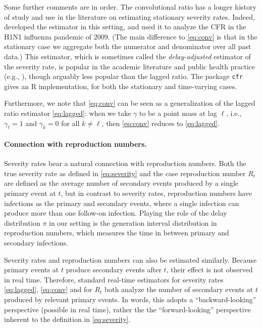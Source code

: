 \documentclass{article}
\begin{document}
Some further comments are in order. The convolutional ratio has a longer history
of study and use in the literature on estimating stationary severity
rates. Indeed, \citet{nishiura} developed the estimator in this setting,  
and used it to analyze the CFR in the H1N1 influenza pandemic of 2009. (The main 
difference to \eqref{eq:conv} is that in the stationary case we aggregate both
the numerator and denominator over all past data.) This estimator, which is
sometimes called the \emph{delay-adjusted} estimator of the severity rate, is
popular in the academic literature and public health practice (e.g., 
\citealp{nishiuraEx1, nishiuraEx2, Russell2020, Unnikrishnan2021}), though   
arguably less popular than the lagged ratio. The package \texttt{cfr}
\citep{cfr_package} gives an R implementation, for both the stationary and
time-varying cases.  

Furthermore, we note that \eqref{eq:conv} can be seen as a generalization of the  
lagged ratio estimator \eqref{eq:lagged}: when we take $\gamma$ to be a point
mass at lag $\ell$, i.e., $\gamma_\ell = 1$ and $\gamma_k = 0$ for all $k \not=
\ell$, then \eqref{eq:conv} reduces to \eqref{eq:lagged}.   

\paragraph{Connection with reproduction numbers.} 

Severity rates bear a natural connection with reproduction numbers. Both the
true severity rate as defined in \eqref{eq:severity} and the case reproduction
number $R_t$ are defined as the average number of secondary events produced by a
single primary event at $t$, but in contrast to severity rates, reproduction
numbers have infections as the primary and secondary events, where a single
infection can produce more than one follow-on infection. Playing the role of the
delay distribution $\pi$ in our setting is the generation interval distribution
in reproduction numbers, which measures the time in between primary and
secondary infections.  

Severity rates and reproduction numbers can also be estimated similarly. Because
primary events at $t$ produce secondary events after $t$, their effect is not
observed in real time. Therefore, standard real-time estimators for severity
rates \eqref{eq:lagged}, \eqref{eq:conv} and for $R_t$ both analyze the number
of  secondary events at $t$ produced by relevant primary events. In words, this 
adopts a ``backward-looking'' perspective (possible in real time), rather the 
the ``forward-looking'' perspective inherent to the definition in
\eqref{eq:severity}. 
\end{document}
